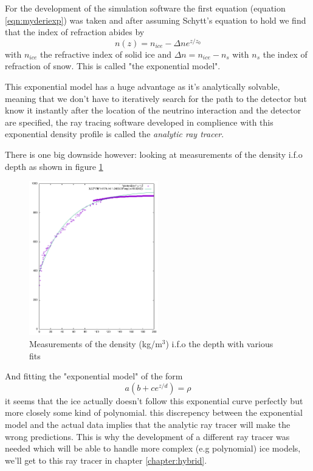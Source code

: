 \documentclass[11pt,a4paper,faculty=we,language=en,doctype=report]{cls/ugent-doc}
\begin{document}
For the development of the simulation software the first equation (equation \ref{eqn:myderiexp}) was
taken and after assuming Schytt's equation to hold we find that the
index of refraction abides by
\begin{equation}
	\label{eqn:expn}
	n(z) = n_{ice} - \Delta n e^{z/z_0}
\end{equation}
with $n_{ice}$ the refractive index of solid ice and $\Delta n = n_{ice} - n_s$
with $n_s$ the index of refraction of snow. This is called "the exponential
model".  

This exponential model has a huge advantage as it's analytically 
solvable, meaning that we don't have to iteratively search for the 
path to the detector but know it instantly after the location of
the neutrino interaction and the detector are specified, the ray 
tracing software developed in complience with this exponential density
profile is called the \textit{analytic ray tracer}.

There is one big downside however: looking at measurements of the density i.f.o depth as shown in figure \ref{fig:DensityMeasurements} 
\begin{figure}
  \centering
	\includegraphics[width=0.5\textwidth]{Density_measurements2.pdf}
	\caption{Measurements of the density (kg/m$^3$) i.f.o the depth with various fits}
	\label{fig:DensityMeasurements}
\end{figure}
And fitting the "exponential model" of 
the form
\begin{equation}
	a(b + c e^{z/d}) = \rho
\end{equation}
it seems that the ice actually doesn't follow this exponential curve perfectly
but more closely some kind of polynomial. this discrepency between the
exponential model and the actual data implies that the analytic ray tracer will
make the wrong predictions.  This is why the development of a different ray
tracer was needed which will be able to handle more complex (e.g polynomial)
ice models, we'll get to this ray tracer in chapter \ref{chapter:hybrid}.
\end{document}
